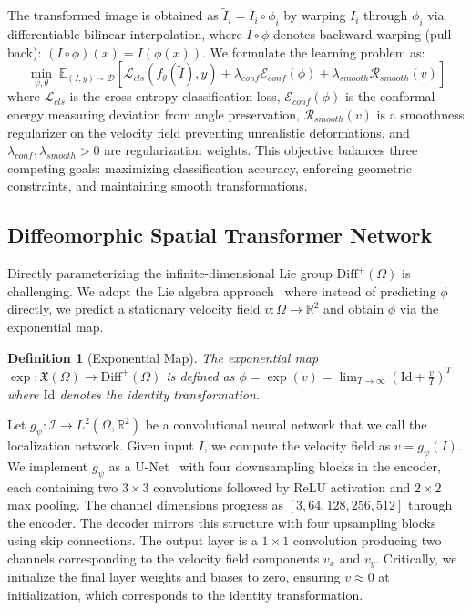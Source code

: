 \documentclass[10pt,journal,compsoc]{IEEEtran}
\newtheorem{definition}{Definition}
\begin{document}
The transformed image is obtained as $\tilde{I}_i = I_i \circ \phi_i$ by warping $I_i$ through $\phi_i$ via differentiable bilinear interpolation, where $I \circ \phi$ denotes backward warping (pull-back): $(I \circ \phi)(x) = I(\phi(x))$. We formulate the learning problem as:
\begin{equation}
\min_{\psi, \theta} \; \mathbb{E}_{(I,y) \sim \mathcal{D}} \left[ \mathcal{L}_{cls}(f_\theta(\tilde{I}), y) + \lambda_{conf} \mathcal{E}_{conf}(\phi) + \lambda_{smooth} \mathcal{R}_{smooth}(v) \right]
\label{eq:objective}
\end{equation}
where $\mathcal{L}_{cls}$ is the cross-entropy classification loss, $\mathcal{E}_{conf}(\phi)$ is the conformal energy measuring deviation from angle preservation, $\mathcal{R}_{smooth}(v)$ is a smoothness regularizer on the velocity field preventing unrealistic deformations, and $\lambda_{conf}, \lambda_{smooth} > 0$ are regularization weights. This objective balances three competing goals: maximizing classification accuracy, enforcing geometric constraints, and maintaining smooth transformations.

\subsection{Diffeomorphic Spatial Transformer Network}

Directly parameterizing the infinite-dimensional Lie group $\text{Diff}^+(\Omega)$ is challenging. We adopt the Lie algebra approach~\cite{arsigny2006logdiff,voxelmorph} where instead of predicting $\phi$ directly, we predict a stationary velocity field $v: \Omega \rightarrow \mathbb{R}^2$ and obtain $\phi$ via the exponential map.

\begin{definition}[Exponential Map]
\label{def:exp_map}
The exponential map $\exp: \mathfrak{X}(\Omega) \rightarrow \text{Diff}^+(\Omega)$ is defined as $\phi = \exp(v) = \lim_{T \rightarrow \infty} \left( \text{Id} + \frac{v}{T} \right)^T$ where $\text{Id}$ denotes the identity transformation.
\end{definition}

Let $g_\psi: \mathcal{I} \rightarrow L^2(\Omega, \mathbb{R}^2)$ be a convolutional neural network that we call the localization network. Given input $I$, we compute the velocity field as $v = g_\psi(I)$. We implement $g_\psi$ as a U-Net~\cite{ronneberger2015unet} with four downsampling blocks in the encoder, each containing two $3 \times 3$ convolutions followed by ReLU activation and $2 \times 2$ max pooling. The channel dimensions progress as $[3, 64, 128, 256, 512]$ through the encoder. The decoder mirrors this structure with four upsampling blocks using skip connections. The output layer is a $1 \times 1$ convolution producing two channels corresponding to the velocity field components $v_x$ and $v_y$. Critically, we initialize the final layer weights and biases to zero, ensuring $v \approx 0$ at initialization, which corresponds to the identity transformation.
\end{document}
